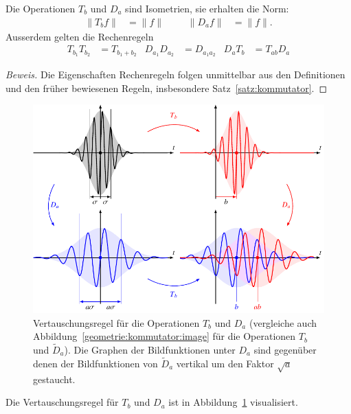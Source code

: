 \begin{satz}
Die Operationen $T_b$ und $D_a$ sind Isometrien, sie erhalten die
Norm:
\[
\begin{aligned}
\| T_bf \| &= \|f\|
&&&
\| D_af \| &= \| f \|.
\end{aligned}
\]
Ausserdem gelten die Rechenregeln
\begin{align*}
T_{b_1}T_{b_2}&=T_{b_1+b_2}
&
D_{a_1} D_{a_2}&=D_{a_1a_2}
&
D_aT_b
&=
T_{ab}D_a
\end{align*}
\end{satz}

\begin{proof}[Beweis]
Die Eigenschaften Rechenregeln folgen unmittelbar aus den Definitionen und
den früher bewiesenen Regeln, insbesondere Satz~\ref{satz:kommutator}.
\end{proof}

\begin{figure}
\centering
\includegraphics{chapters/2-fourier/images/kommutatorD.pdf}
\caption{Vertauschungsregel für die Operationen $T_b$ und $D_a$
(vergleiche auch Abbildung~\ref{geometrie:kommutator:image} für
die Operationen $T_b$ und $\tilde{D}_a$).
Die Graphen der Bildfunktionen unter $D_a$ sind gegenüber denen der
Bildfunktionen von $\tilde{D}_a$ vertikal um den Faktor $\sqrt{a}$
gestaucht.
\label{geometrie:kommutatorD:image}}
\end{figure}

Die Vertauschungsregel für $T_b$ und $D_a$ ist in
Abbildung~\ref{geometrie:kommutatorD:image} visualisiert.






